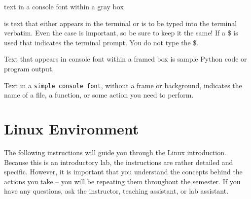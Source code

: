 \documentclass[11pt]{cselabheader}
\begin{document}
\begin{bashcode}
text in a console font within a gray box
\end{bashcode}

is text that either appears in the terminal or is to be typed into the terminal
verbatim. Even the case is important, so be sure to keep it the same! If a \$ is
used that indicates the terminal prompt. You do not type the \$.

\begin{python3code}
Text that appears in console font within a framed box is sample Python code
or program output.
\end{python3code}

Text in a \texttt{simple console font}, without a frame or background, indicates
the name of a file, a function, or some action you need to perform.



\section{Linux Environment}
\label{sec:linux}

The following instructions will guide you through the Linux introduction.
Because this is an introductory lab, the instructions are rather detailed and
specific. However, it is important that you understand the concepts behind the
actions you take -- you will be repeating them throughout the semester. If you
have any questions, ask the instructor, teaching assistant, or lab assistant.
\end{document}
